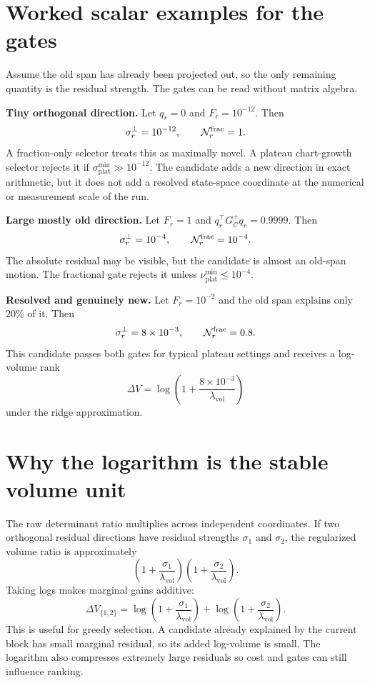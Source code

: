 \documentclass[10pt,twocolumn]{article}
\newcommand{\plat}{\mathrm{plat}}
\newcommand{\vol}{\mathrm{vol}}
\begin{document}
\section{Worked scalar examples for the gates}

Assume the old span has already been projected out, so the only remaining
quantity is the residual strength. The gates can be read without matrix algebra.

\textbf{Tiny orthogonal direction.} Let $q_r=0$ and $F_r=10^{-12}$. Then
\[
\sigma_r^\perp=10^{-12},
\qquad
\mathcal N_r^{\rm frac}=1.
\]
A fraction-only selector treats this as maximally novel. A plateau chart-growth
selector rejects it if $\sigma_{\plat}^{\min}\gg10^{-12}$. The candidate adds a
new direction in exact arithmetic, but it does not add a resolved state-space
coordinate at the numerical or measurement scale of the run.

\textbf{Large mostly old direction.} Let $F_r=1$ and
$q_r^\top G_C^+q_r=0.9999$. Then
\[
\sigma_r^\perp=10^{-4},
\qquad
\mathcal N_r^{\rm frac}=10^{-4}.
\]
The absolute residual may be visible, but the candidate is almost an old-span
motion. The fractional gate rejects it unless $\nu_{\plat}^{\min}\le10^{-4}$.

\textbf{Resolved and genuinely new.} Let $F_r=10^{-2}$ and the old span explains
only $20\%$ of it. Then
\[
\sigma_r^\perp=8\times10^{-3},
\qquad
\mathcal N_r^{\rm frac}=0.8.
\]
This candidate passes both gates for typical plateau settings and receives a
log-volume rank
\[
\Delta V=\log\left(1+\frac{8\times10^{-3}}{\lambda_{\vol}}\right)
\]
under the ridge approximation.

\section{Why the logarithm is the stable volume unit}

The raw determinant ratio multiplies across independent coordinates. If two
orthogonal residual directions have residual strengths $\sigma_1$ and
$\sigma_2$, the regularized volume ratio is approximately
\[
\left(1+\frac{\sigma_1}{\lambda_{\vol}}\right)
\left(1+\frac{\sigma_2}{\lambda_{\vol}}\right).
\]
Taking logs makes marginal gains additive:
\[
\Delta V_{\{1,2\}}
=\log\left(1+\frac{\sigma_1}{\lambda_{\vol}}\right)
+\log\left(1+\frac{\sigma_2}{\lambda_{\vol}}\right).
\]
This is useful for greedy selection. A candidate already explained by the
current block has small marginal residual, so its added log-volume is small.
The logarithm also compresses extremely large residuals so cost and gates can
still influence ranking.
\end{document}
